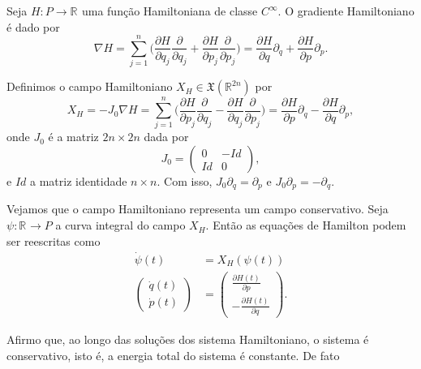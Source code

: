 \documentclass[12pt]{book}
\newcommand{\bigparenteses}[1]{\Big( #1 \Big) }
\newcommand{\campohamiltoniano}[1]{X_{H}(#1)}
\newcommand{\campohamiltonianoabrev}{X_{H}}
\newcommand{\campossuaves}[1]{\mathfrak{X}(#1)}
\newcommand{\derivadaparcial}[2]{\frac{\partial #1}{\partial #2}}
\newcommand{\derivadaparcialabrev}[1]{\partial_{#1}}
\newcommand{\estruturacomplexa}{J_{0}}
\newcommand{\real}[1]{\mathbb{R}^{#1}}
\newcommand{\reta}{\real{}}
\begin{document}
	Seja $H:P \to \reta$ uma função Hamiltoniana de classe $C^{\infty}$. O gradiente Hamiltoniano é dado por
	$$
	\nabla H =\sum_{j=1}^{n} \bigparenteses{\derivadaparcial{H}{q_{j}}\derivadaparcial{}{q_{j}} + \derivadaparcial{H}{p_{j}}\derivadaparcial{}{p_{j}} }= \derivadaparcial{H}{q}\derivadaparcialabrev{q} + \derivadaparcial{H}{p}\derivadaparcialabrev{p}.
	$$
	
	Definimos o campo Hamiltoniano $\campohamiltonianoabrev \in \campossuaves{\real{2n}}$ por 
	$$
	\campohamiltonianoabrev = -\estruturacomplexa \nabla H = \sum_{j=1}^{n}\bigparenteses{\derivadaparcial{H}{p_{j}}\derivadaparcial{}{q_{j}} - \derivadaparcial{H}{q_{j}}\derivadaparcial{}{p_{j}} } = \derivadaparcial{H}{p}\derivadaparcialabrev{q} - \derivadaparcial{H}{q}\derivadaparcialabrev{p}, 
	$$
	onde $\estruturacomplexa$ é a matriz $2n \times 2n$ dada por
	$$
	\estruturacomplexa=
	\left(
	\begin{array}{cc}
	0 & -Id
	\\
	Id & 0
	\end{array}
	\right), 
	$$
	e $Id$ a matriz identidade $n\times n$. Com isso, $\estruturacomplexa \derivadaparcialabrev{q} = \derivadaparcialabrev{p}$ e $\estruturacomplexa \derivadaparcialabrev{p} = -\derivadaparcialabrev{q}$.
	
	Vejamos que o campo Hamiltoniano representa um campo conservativo. Seja $\psi:\reta \to P$ a curva integral do campo $\campohamiltonianoabrev$. Então as equações de Hamilton podem ser reescritas como 
	$$
	\begin{aligned}
	\dot{\psi}(t) &= \campohamiltoniano{\psi(t)}
	\\
	\left(
	\begin{array}{c}
	\dot{q}(t)
	\\
	\dot{p}(t)
	\end{array}
	\right)
	&=
	\left(
	\begin{array}{c}
	\derivadaparcial{H(t)}{p}
	\\
	-\derivadaparcial{H(t)}{q}
	\end{array}
	\right).
	\end{aligned}
	$$	
	
	Afirmo que, ao longo das soluções dos sistema Hamiltoniano, o sistema é conservativo, isto é, a energia total do sistema é constante. De fato
	
\end{document}
